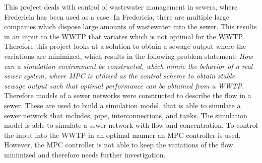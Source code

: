 This project deals with control of wastewater management in sewers, where Fredericia has been used as a case. In Fredericia, there are multiple large companies which dispose large amounts of wastewater into the sewer. This results in an input to the WWTP that variates which is not optimal for the WWTP. Therefore this project looks at a solution to obtain a sewage output where the variations are minimized, which results in the following problem statement: \textit{How can a simulation environment be constructed, which mimic the behavior of a real sewer system, where MPC is utilized as the control scheme to obtain stable sewage output such that optimal performance can be obtained from a WWTP.} Therefore models of a sewer networks were constructed to describe the flow in a sewer. These are used to build a simulation model, that is able to simulate a sewer network that includes, pipe, interconnections, and tanks. The simulation model is able to simulate a sewer network with flow and concentration. To control the input into the WWTP in an optimal manner an MPC controller is used. However, the MPC controller is not able to keep the variations of the flow minimized and therefore needs further investigation.            








